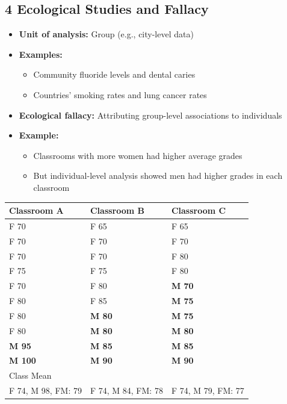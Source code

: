 \documentclass[
  letterpaper,
  DIV=11,
  numbers=noendperiod]{scrartcl}
\providecommand{\tightlist}{%
  \setlength{\itemsep}{0pt}\setlength{\parskip}{0pt}}
\begin{document}
\subsection{\texorpdfstring{{4} {Ecological Studies and
Fallacy}}{4 Ecological Studies and Fallacy}}\label{ecological-studies-and-fallacy}

\begin{itemize}
\tightlist
\item
  \textbf{Unit of analysis:} Group (e.g., city-level data)
\item
  \textbf{Examples:}

  \begin{itemize}
  \tightlist
  \item
    Community fluoride levels and dental caries
  \item
    Countries' smoking rates and lung cancer rates
  \end{itemize}
\item
  \textbf{Ecological fallacy:} Attributing group-level associations to
  individuals
\item
  \textbf{Example:}

  \begin{itemize}
  \tightlist
  \item
    Classrooms with more women had higher average grades
  \item
    But individual-level analysis showed men had higher grades in each
    classroom
  \end{itemize}
\end{itemize}

\begin{longtable}[]{@{}lll@{}}
\toprule\noalign{}
Classroom A & Classroom B & Classroom C \\
\midrule\noalign{}
\endhead
\bottomrule\noalign{}
\endlastfoot
F 70 & F 65 & F 65 \\
F 70 & F 70 & F 70 \\
F 70 & F 70 & F 80 \\
F 75 & F 75 & F 80 \\
F 70 & F 80 & \textbf{M 70} \\
F 80 & F 85 & \textbf{M 75} \\
F 80 & \textbf{M 80} & \textbf{M 75} \\
F 80 & \textbf{M 80} & \textbf{M 80} \\
\textbf{M 95} & \textbf{M 85} & \textbf{M 85} \\
\textbf{M 100} & \textbf{M 90} & \textbf{M 90} \\
Class Mean & & \\
F 74, M 98, FM: 79 & F 74, M 84, FM: 78 & F 74, M 79, FM: 77 \\
\end{longtable}
\end{document}
